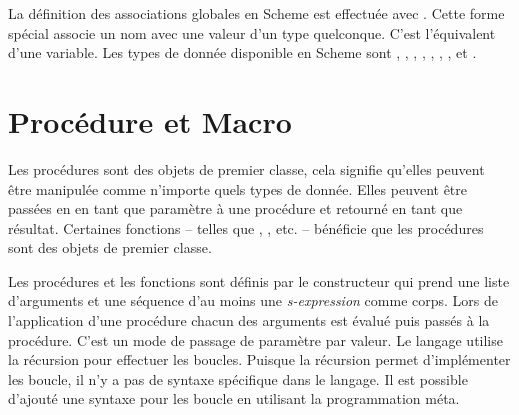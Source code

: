 La définition des associations globales en Scheme est effectuée avec .
Cette forme spécial associe un nom avec une valeur d'un type quelconque.
C'est l'équivalent d'une variable. Les types de donnée disponible en Scheme sont
, , , ,
, , ,  et
.

\section{Procédure et Macro}
\label{sec:proc_and_macro}

Les procédures sont des objets de premier classe, cela signifie qu'elles
peuvent être manipulée comme n'importe quels types de donnée. Elles peuvent
être passées en en tant que paramètre à une procédure et retourné en tant que
résultat.  Certaines fonctions -- telles que , , etc.
-- bénéficie que les procédures sont des objets de premier classe.

Les procédures et les fonctions sont définis par le constructeur
 qui prend une liste d'arguments et une séquence d'au moins une
\textit{s-expression} comme corps. Lors de l'application d'une procédure chacun
des arguments est évalué puis passés à la procédure. C'est un mode de passage
de paramètre par valeur.  Le langage utilise la récursion pour effectuer les
boucles. Puisque la récursion permet d'implémenter les boucle, il n'y a pas de syntaxe
spécifique dans le langage. Il est possible d'ajouté une syntaxe pour les
boucle en utilisant la programmation méta.



